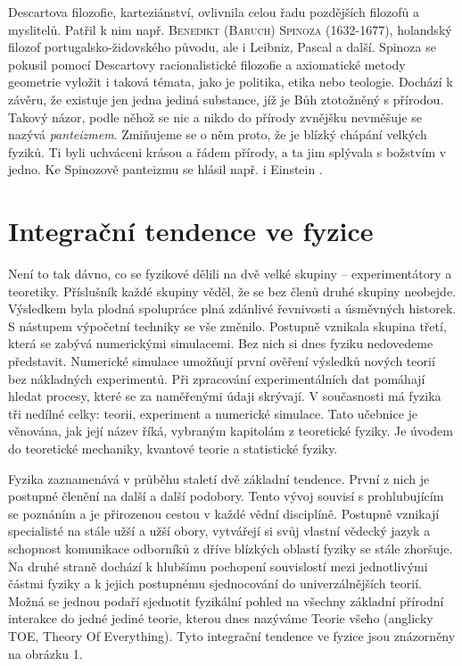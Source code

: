     Descartova filozofie, karteziánství, ovlivnila celou řadu pozdějších filozofů a myslitelů.
    Patřil k nim např. \textsc{Benedikt (Baruch) Spinoza} (1632-1677), holandský filozof
    portugalsko-židovského původu, ale i Leibniz, Pascal a další. Spinoza se pokusil pomocí
    Descartovy racionalistické filozofie a axiomatické metody geometrie vyložit i taková témata,
    jako je politika, etika nebo teologie. Dochází k závěru, že existuje jen jedna jediná substance,
    jíž je Bůh ztotožněný s přírodou. Takový názor, podle něhož se nic a nikdo do přírody zvnějšku
    nevměšuje se nazývá \emph{panteizmem}. Zmiňujeme se o něm proto, že je blízký chápání velkých
    fyziků. Ti byli uchváceni krásou a řádem přírody, a ta jim splývala s božstvím v jedno. Ke
    Spinozově panteizmu se hlásil např. i Einstein \cite[s.~141]{Stoll2009}.    
    
  \section{Integrační tendence ve fyzice}\label{fyz:IchapIsecVIII}
    Není to tak dávno, co se fyzikové dělili na dvě velké skupiny – experimentátory a teoretiky.
    Příslušník každé skupiny věděl, že se bez členů druhé skupiny neobejde. Výsledkem byla plodná
    spolupráce plná zdánlivé řevnivosti a úsměvných historek. S nástupem výpočetní techniky se vše
    změnilo. Postupně vznikala skupina třetí, která se zabývá numerickými simulacemi. Bez nich si
    dnes fyziku nedovedeme představit. Numerické simulace umožňují první ověření výsledků nových
    teorií bez nákladných experimentů. Při zpracování experimentálních dat pomáhají hledat procesy,
    které se za naměřenými údaji skrývají. V současnosti má fyzika tři nedílné celky: teorii,
    experiment a numerické simulace. Tato učebnice je věnována, jak její název říká, vybraným
    kapitolám z teoretické fyziky. Je úvodem do teoretické mechaniky, kvantové teorie a statistické
    fyziky. 
    
    Fyzika zaznamenává v průběhu staletí dvě základní tendence. První z nich je postupné členění na
    další a další podobory. Tento vývoj souvisí s prohlubujícím se poznáním a je přirozenou cestou v
    každé vědní disciplíně. Postupně vznikají specialisté na stále užší a užší obory, vytvářejí si
    svůj vlastní vědecký jazyk a schopnost komunikace odborníků z dříve blízkých oblastí fyziky se
    stále zhoršuje. Na druhé straně dochází k hlubšímu pochopení souvislostí mezi jednotlivými
    částmi fyziky a k jejich postupnému sjednocování do univerzálnějších teorií. Možná se jednou
    podaří sjednotit fyzikální pohled na všechny základní přírodní interakce do jedné jediné teorie,
    kterou dnes nazýváme Teorie všeho (anglicky TOE, Theory Of Everything). Tyto integrační tendence
    ve fyzice jsou znázorněny na obrázku 1. 

